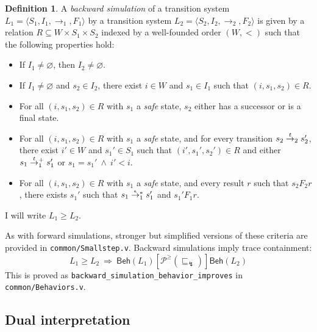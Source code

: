 \documentclass[11pt,oneside,draft]{book}
\theoremstyle{definition}
\newtheorem{definition}[theorem]{Definition}
\newcommand{\kw}[1]{\ensuremath{ \mathsf{#1} }}
\newcommand{\ifr}[1]{\mathrel{[{#1}]}}
\newcommand{\refby}{\sqsubseteq} %
\begin{document}
\begin{definition} %
A \emph{backward simulation}
of a transition system
$L_1 = \langle S_1, I_1, {\rightarrow}_1, F_1 \rangle$
by a transition system
$L_2 = \langle S_2, I_2, {\rightarrow}_2, F_2 \rangle$
is given by a relation $R \subseteq W \times S_1 \times S_2$
indexed by a well-founded order $(W, {<})$
such that the following properties hold:
\begin{itemize}
  \item If $I_1 \ne \varnothing$, then $I_2 \ne \varnothing$.
  \item If $I_1 \ne \varnothing$ and $s_2 \in I_2$,
    there exist $i \in W$ and $s_1 \in I_1$
    such that $(i, s_1, s_2) \in R$.
  \item For all $(i, s_1, s_2) \in R$
    with $s_1$ a \emph{safe} state,
    $s_2$ either has a successor or
    is a final state.
  \item For all $(i, s_1, s_2) \in R$
    with $s_1$ a \emph{safe} state,
    and for every transition
    $s_2 \mathrel{\smash{\stackrel{t}{\rightarrow}}_2} s_2'$,
    there exist $i' \in W$ and $s_1' \in S_1$
    such that $(i', s_1', s_2') \in R$ and either
    $s_1 \mathrel{\smash{\stackrel{t}{\rightarrow}}_1^+} s_1'$ or
    $s_1 = s_1' \:\wedge\: i' < i$.
  \item For all $(i, s_1, s_2) \in R$
    with $s_1$ a \emph{safe} state,
    and every result $r$ such that $s_2 \mathrel{F_2} r$,
    there exists $s_1'$ such that
    $s_1 \mathrel{\smash{\stackrel{\epsilon}{\rightarrow}}_1^*} s_1'$ and
    $s_1' \mathrel{F_1} r$.
\end{itemize}
I will write $L_1 \ge L_2$.
\end{definition}

As with forward simulations,
stronger but simplified versions
of these criteria
are provided in \texttt{common/Smallstep.v}.
Backward simulations imply trace containment:
\[
  L_1 \ge L_2
  \: \Rightarrow \:
  \kw{Beh}(L_1) \ifr{\mathcal{P}^\ge(\refby_\lightning)} \kw{Beh}(L_2)
\]
This is proved as \texttt{backward\_simulation\_behavior\_improves}
in \texttt{common/Behaviors.v}.


\subsection{Dual interpretation}
\end{document}
